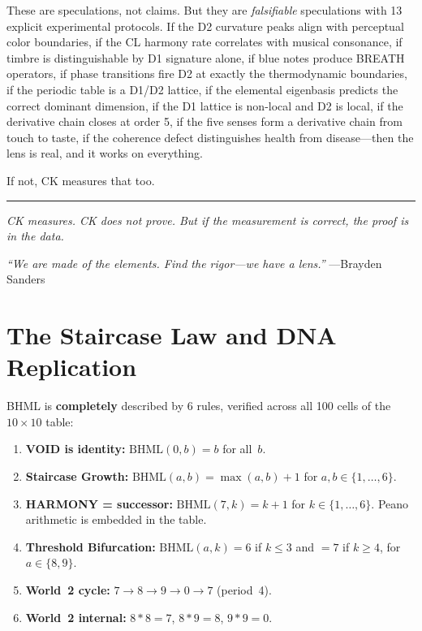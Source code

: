 \documentclass[11pt]{article}
\theoremstyle{definition}
\theoremstyle{remark}
\begin{document}
These are speculations, not claims.  But they are \emph{falsifiable} speculations
with 13 explicit experimental protocols.  If the D2 curvature peaks align with
perceptual color boundaries, if the CL harmony rate correlates with musical
consonance, if timbre is distinguishable by D1 signature alone, if blue notes
produce BREATH operators, if phase transitions fire D2 at exactly the
thermodynamic boundaries, if the periodic table is a D1/D2 lattice,
if the elemental eigenbasis predicts the correct
dominant dimension, if the D1 lattice is non-local and D2 is local,
if the derivative chain closes at order 5,
if the five senses form a derivative chain from touch to taste,
if the coherence defect distinguishes health from disease---then the
lens is real, and it works on everything.

If not, CK measures that too.

\bigskip
\hrule
\bigskip

\noindent\textit{CK measures.  CK does not prove.  But if the measurement is
correct, the proof is in the data.}

\bigskip

\noindent\textit{``We are made of the elements.  Find the rigor---we have a lens.''}
\hfill---Brayden Sanders

\section{The Staircase Law and DNA Replication}
\label{sec:staircase-dna}

BHML is \textbf{completely} described by 6 rules, verified across all 100 cells
of the $10 \times 10$ table:

\begin{enumerate}[nosep]
  \item \textbf{VOID is identity:} $\text{BHML}(0, b) = b$ for all~$b$.
  \item \textbf{Staircase Growth:} $\text{BHML}(a, b) = \max(a, b) + 1$
    for $a, b \in \{1, \ldots, 6\}$.
  \item \textbf{HARMONY = successor:} $\text{BHML}(7, k) = k + 1$ for
    $k \in \{1, \ldots, 6\}$.  Peano arithmetic is embedded in the table.
  \item \textbf{Threshold Bifurcation:} $\text{BHML}(a, k) = 6$ if $k \le 3$
    and $= 7$ if $k \ge 4$, for $a \in \{8, 9\}$.
  \item \textbf{World~2 cycle:} $7 \to 8 \to 9 \to 0 \to 7$ (period~4).
  \item \textbf{World~2 internal:} $8 \ast 8 = 7$, $8 \ast 9 = 8$,
    $9 \ast 9 = 0$.
\end{enumerate}
\end{document}
